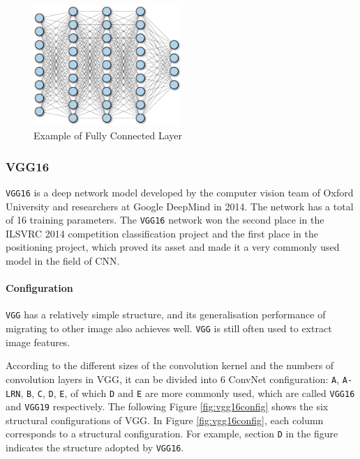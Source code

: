 \begin{figure}[h!]
\centering
\includegraphics[width=0.5\textwidth]{fullyconnected.pdf}
\caption{Example of Fully Connected Layer}
\label{fig:fully}
\end{figure}

\subsubsection{VGG16}

\verb|VGG16| \cite{vgg16} is a deep network model developed by the computer vision team of Oxford University and researchers at Google DeepMind in 2014. The network has a total of 16 training parameters. The \verb|VGG16| network won the second place in the ILSVRC 2014 competition classification project and the first place in the positioning project, which proved its asset and made it a very commonly used model in the field of CNN.

\paragraph{Configuration}
\verb|VGG| has a relatively simple structure, and its generalisation performance of migrating to other image also achieves well. \verb|VGG| is still often used to extract image features.

According to the different sizes of the convolution kernel and the numbers of convolution layers in VGG, it can be divided into 6 ConvNet configuration: \verb|A|, \verb|A-LRN|, \verb|B|, \verb|C|, \verb|D|, \verb|E|, of which \verb|D| and \verb|E| are more commonly used, which are called \verb|VGG16| and \verb|VGG19| respectively. The following Figure \ref{fig:vgg16config} shows the six structural configurations of VGG. In Figure \ref{fig:vgg16config}, each column corresponds to a structural configuration. For example, section \verb|D| in the figure indicates the structure adopted by \verb|VGG16|.

